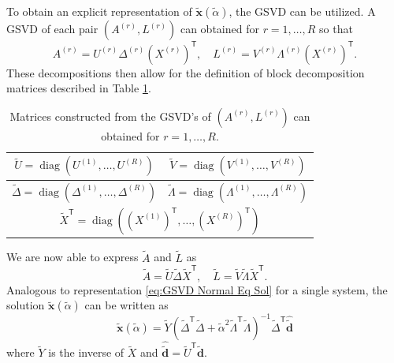 \documentclass[12pt]{article}
\newcommand{\dVec}{\mathbf{d}}	%
\newcommand{\xVec}{\mathbf{x}}	%
\newcommand{\trans}[1]{{#1}^\mathsf{T}}	%
\newcommand{\inv}[1]{{#1}^{-1}}	%
\DeclareMathOperator{\diag}{diag}	%
\newcommand{\regparam}{\alpha}  %
\newcommand{\regparamBig}{\widetilde{\regparam}}   %
\newcommand{\xBig}{\widetilde{\xVec}}	%
\newcommand{\dBig}{\widetilde{\dVec}}	%
\newcommand{\ABig}{\widetilde{A}}	%
\newcommand{\LBig}{\widetilde{L}}	%
\newcommand{\svd}[1]{\widehat{#1}}	%
\begin{document}
To obtain an explicit representation of $\xBig(\regparamBig)$, the GSVD can be utilized. A GSVD of each pair $(A^{(r)},L^{(r)})$ can obtained for $r = 1,\ldots,R$ so that
\begin{equation}
    A^{(r)} = U^{(r)}\Delta^{(r)}\trans{\left(X^{(r)}\right)}, \quad L^{(r)} = V^{(r)}\Lambda^{(r)}\trans{\left(X^{(r)}\right)}.
\end{equation}
These decompositions then allow for the definition of block decomposition matrices described in Table \ref{tab:Block GSVD Matrices}.
\begin{table}[ht!]
  \begin{center}
    \caption{Matrices constructed from the GSVD's of $(A^{(r)},L^{(r)})$ can obtained for $r = 1,\ldots,R$.}
    \label{tab:Block GSVD Matrices}
    \begin{tabular}{|c|c|}
    \hline
    $\widetilde{U} = \diag\left(U^{(1)},\ldots,U^{(R)}\right)$ & $\widetilde{V} = \diag\left(V^{(1)},\ldots,V^{(R)}\right)$ \\
    \hline
    $\widetilde{\Delta} = \diag\left(\Delta^{(1)},\ldots,\Delta^{(R)}\right)$ & $\widetilde{\Lambda} = \diag\left(\Lambda^{(1)},\ldots,\Lambda^{(R)}\right)$ \\
    \hline
    \multicolumn{2}{|c|}{$\trans{\widetilde{X}} = \diag\left(\trans{\left(X^{(1)}\right)},\ldots,\trans{\left(X^{(R)}\right)}\right)$} \\
    \hline
    \end{tabular}
  \end{center}
\end{table}
We are now able to express $\ABig$ and $\LBig$ as
\begin{equation}
    \label{eq:Adapted A and L GSVD}
    \ABig = \widetilde{U}\widetilde{\Delta}\trans{\widetilde{X}}, \quad \LBig = \widetilde{V}\widetilde{\Lambda}\trans{\widetilde{X}}.
\end{equation}
Analogous to representation \eqref{eq:GSVD Normal Eq Sol} for a single system, the solution $\xBig(\regparamBig)$ can be written as 
\begin{equation}
    \label{eq:GSVD Big Normal Eq Sol}
    \xBig(\regparamBig) = \widetilde{Y}\inv{\left(\trans{\widetilde{\Delta}}\widetilde{\Delta} + \widetilde{\regparam}^2 \trans{\widetilde{\Lambda}}\widetilde{\Lambda}\right)}\trans{\widetilde{\Delta}}\svd{\dBig}
\end{equation}
where $\widetilde{Y}$ is the inverse of $\widetilde{X}$ and $\svd{\dBig} = \trans{\widetilde{U}}\dBig$. \par
\end{document}
